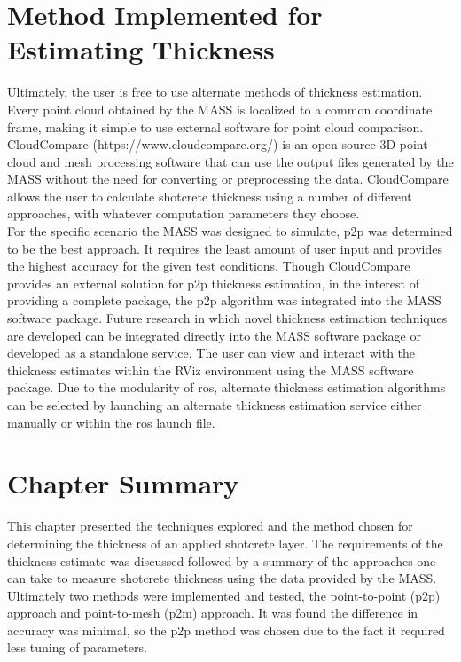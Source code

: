 \section{Method Implemented for Estimating Thickness}
Ultimately, the user is free to use alternate methods of thickness estimation. Every point cloud obtained by the MASS is localized to a common coordinate frame, making it simple to use external software for point cloud comparison. CloudCompare (https://www.cloudcompare.org/) is an open source 3D point cloud and mesh processing software that can use the output files generated by the MASS without the need for converting or preprocessing the data. CloudCompare allows the user to calculate shotcrete thickness using a number of different approaches, with whatever computation parameters they choose.\\

For the specific scenario the MASS was designed to simulate, \acrshort{p2p} was determined to be the best approach. It requires the least amount of user input and provides the highest accuracy for the given test conditions. Though CloudCompare provides an external solution for \acrshort{p2p} thickness estimation, in the interest of providing a complete package, the \acrshort{p2p} algorithm was integrated into the MASS software package. Future research in which novel thickness estimation techniques are developed can be integrated directly into the MASS software package or developed as a standalone service. The user can view and interact with the thickness estimates within the RViz environment using the MASS software package. Due to the modularity of \acrshort{ros}, alternate thickness estimation algorithms can be selected by launching an alternate thickness estimation service either manually or within the \acrshort{ros} launch file.\\
\section{Chapter Summary}
This chapter presented the techniques explored and the method chosen for determining the thickness of an applied shotcrete layer. The requirements of the thickness estimate was discussed followed by a summary of the approaches one can take to measure shotcrete thickness using the data provided by the MASS. Ultimately two methods were implemented and tested, the point-to-point (\acrshort{p2p}) approach and point-to-mesh (\acrshort{p2m}) approach. It was found the difference in accuracy was minimal, so the \acrshort{p2p} method was chosen due to the fact it required less tuning of parameters.\\